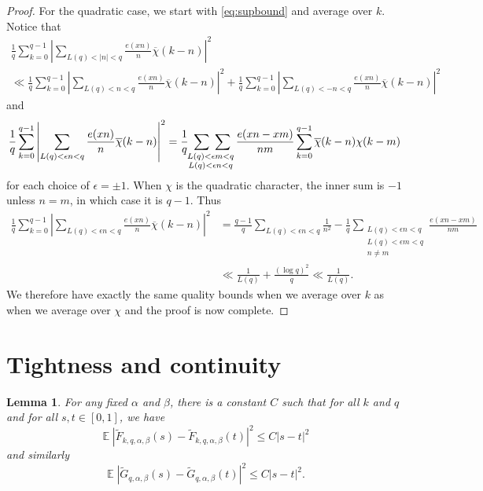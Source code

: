 \documentclass[12pt, a4paper]{amsart}
\newtheorem{lemma}{Lemma}
\theoremstyle{remark}
\newcommand{\abs}[1]{\left|#1\right|}
\newcommand{\chibar}{\overline \chi}
\DeclareMathOperator{\E}{\mathbb{E}}
\begin{document}
\begin{proof}
    For the quadratic case, we start with \eqref{eq:supbound} and average over
    $k$.
    Notice that
    \begin{multline*}
        \frac{1}{q}
        \sum_{k=0}^{q-1}
            \abs{
            \sum_{L(q) < |n| < q}
            \frac{e(xn)}
            {n}
            \chibar(k - n)
        }^2
        \\
        \ll
        \frac{1}{q}
        \sum_{k=0}^{q-1}
            \abs{
            \sum_{L(q) < n < q}
            \frac{e(xn)}
            {n}
            \chibar(k - n)
        }^2
        +
        \frac{1}{q}
        \sum_{k=0}^{q-1}
            \abs{
            \sum_{L(q) < -n < q}
            \frac{e(xn)}
            {n}
            \chibar(k - n)
        }^2
    \end{multline*}
    and
    \[
        \frac{1}{q}
        \sum_{k=0}^{q-1}
            \abs{
            \sum_{L(q) < \epsilon n < q}
            \frac{e(xn)}
            {n}
            \chibar(k - n)
        }^2
        =
        \frac{1}{q} \hspace{.3em}
        \sum\sum_{\hspace{-2.2em}\substack{L(q) < \epsilon m < q \\ L(q) < \epsilon n < q } }
            \frac{e(xn - xm)}
            {nm}
            \sum_{k=0}^{q-1}
            \chibar(k - n)
            \chi(k - m)
    \]
    for each choice of $\epsilon = \pm 1$.
    When $\chi$ is the quadratic character, the inner sum is $-1$ unless $n = m$,
    in which case it is $q-1$. Thus
    \[
    \begin{split}
        \frac{1}{q}
        \sum_{k=0}^{q-1}
            \abs{
            \sum_{L(q) < \epsilon n < q}
            \frac{e(xn)}
            {n}
            \chibar(k - n)
        }^2
        &=
        \frac{q-1}{q} \sum_{L(q) < \epsilon n < q} \frac{1}{n^2} -
            \frac{1}{q} \sum_{\substack{L(q) < \epsilon n < q \\ L(q) < \epsilon m < q \\ n \ne m}}
            \frac{e(xn - xm)}{nm} \\
        &\ll \frac{1}{L(q)} + \frac{(\log q)^2}{q} \ll \frac{1}{L(q)}.
        \end{split}
    \]
    We therefore have exactly the same quality bounds when we average over $k$ as when we average
    over $\chi$ and the proof is now complete.
\end{proof}

\section{Tightness and continuity}
\begin{lemma}\label{lemma:tightness}
    For any fixed $\alpha$ and $\beta$,
    there is a constant $C$ such that for all $k$ and $q$ and
    for all $s,t \in [0,1]$, we have
\[
    \E \abs{\tilde F_{k,q,\alpha,\beta}(s) - \tilde F_{k,q,\alpha,\beta}(t)}^2
        \le C \abs{s-t}^2
\]
and similarly
\[
    \E \abs{\tilde G_{q,\alpha,\beta}(s) - \tilde G_{q,\alpha,\beta}(t)}^2
        \le C \abs{s-t}^2.
\]
\end{lemma}
\end{document}
